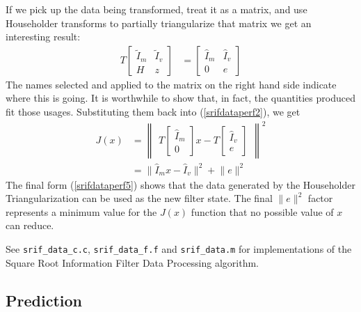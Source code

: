 If we pick up the data being transformed,
treat it as a matrix,
and use Householder transforms
to partially triangularize that matrix
we get an interesting result:
\begin{subequations}
\begin{align}
T \begin{bmatrix}
     {\tilde I}_m  &  {\tilde I}_v
  \\ H             &  z
  \end{bmatrix}
& =
  \begin{bmatrix}
     {\hat   I}_m  &  {\hat   I}_v
  \\ 0             &  e
  \end{bmatrix}
\label{srifdatahouse1}
\end{align}
\end{subequations}
The names selected and applied to the matrix on the right
hand side indicate where this is going. It is worthwhile
to show that, in fact, the quantities produced fit those usages.
Substituting them back into (\ref{srifdataperf2}), we get
\begin{align}
J(x) & = \begin{Vmatrix}
         T \begin{bmatrix} {\hat I}_m \\ 0 \end{bmatrix} x -
         T \begin{bmatrix} {\hat I}_v \\ e \end{bmatrix}
         \end{Vmatrix}^2
\label{srifdataperf4}
\\
  & =  \lVert {\hat I}_m x
    -  {\hat I}_v \rVert ^ 2
    +  \lVert e   \rVert ^ 2
\label{srifdataperf5}
\end{align}
The final form (\ref{srifdataperf5}) shows that
the data generated by the Householder Triangularization
can be used as the new filter state.
The final $\lVert e \rVert ^ 2$ factor represents
a minimum value for the $J(x)$ function that
no possible value of $x$ can reduce.

See \verb|srif_data_c.c|, \verb|srif_data_f.f| and \verb|srif_data.m|
for implementations of the
Square Root Information Filter
Data Processing algorithm.

\newpage
\subsection{Prediction}

